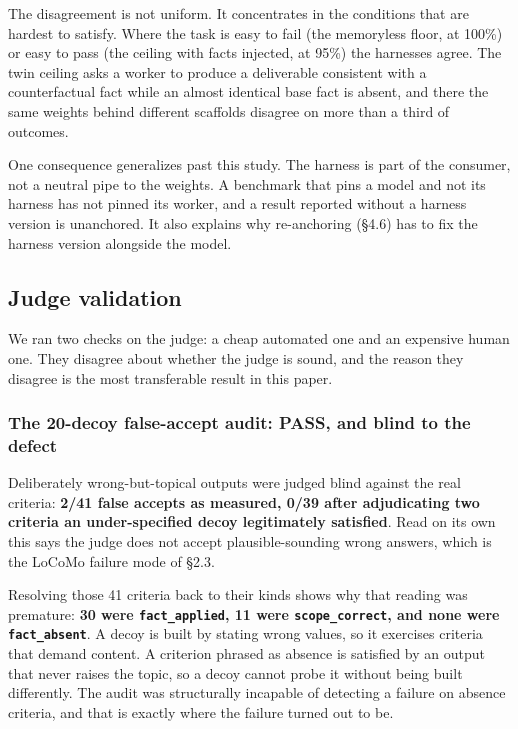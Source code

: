 \documentclass[11pt]{article}
\newcommand{\code}[1]{\texttt{\small #1}}
\begin{document}
The disagreement is not uniform. It concentrates in the conditions that are
hardest to satisfy. Where the task is easy to fail (the memoryless floor, at
100\%) or easy to pass (the ceiling with facts injected, at 95\%) the harnesses
agree. The twin ceiling asks a worker to produce a deliverable consistent with a
counterfactual fact while an almost identical base fact is absent, and there the
same weights behind different scaffolds disagree on more than a third of
outcomes.

One consequence generalizes past this study. The harness is part of the
consumer, not a neutral pipe to the weights. A benchmark that pins a model and
not its harness has not pinned its worker, and a result reported without a harness
version is unanchored. It also explains why re-anchoring (\S4.6) has to fix the
harness version alongside the model.

\subsection{Judge validation}

We ran two checks on the judge: a cheap automated one and an expensive human one.
They disagree about whether the judge is sound, and the reason they disagree is
the most transferable result in this paper.

\subsubsection*{The 20-decoy false-accept audit: PASS, and blind to the defect}

Deliberately wrong-but-topical outputs were judged blind against the real
criteria: \textbf{2/41 false accepts as measured, 0/39 after adjudicating two
criteria an under-specified decoy legitimately satisfied}. Read on its own this
says the judge does not accept plausible-sounding wrong answers, which is the
LoCoMo failure mode of \S2.3.

Resolving those 41 criteria back to their kinds shows why that reading was
premature: \textbf{30 were \code{fact\_applied}, 11 were \code{scope\_correct},
and none were \code{fact\_absent}}. A decoy is built by stating wrong values, so
it exercises criteria that demand content. A criterion phrased as absence is
satisfied by an output that never raises the topic, so a decoy cannot probe it
without being built differently. The audit was structurally incapable of
detecting a failure on absence criteria, and that is exactly where the failure
turned out to be.
\end{document}
